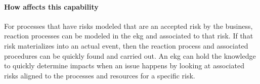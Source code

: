 \paragraph*{How  affects this capability}

For processes that have risks modeled that are an accepted risk by the business,
reaction processes can be modeled in the \gls{ekg} and associated to that risk.
If that risk materializes into an actual event,
then the reaction process and associated procedures can be quickly found and carried out.
An \gls{ekg} can hold the knowledge to quickly determine impacts when an issue happens by looking at
associated risks aligned to the processes and resources for a specific risk.

